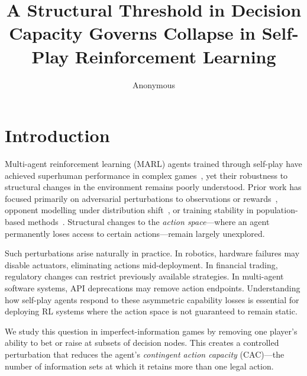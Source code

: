 \documentclass[sigconf,anonymous]{acmart}
\title{A Structural Threshold in Decision Capacity Governs Collapse in Self-Play Reinforcement Learning}
\author{Anonymous}
\affiliation{\institution{Anonymous}}
\begin{document}
\maketitle

\section{Introduction}

Multi-agent reinforcement learning (MARL) agents trained through self-play have achieved superhuman performance in complex games~\cite{silver2018general,brown2019superhuman,vinyals2019grandmaster}, yet their robustness to structural changes in the environment remains poorly understood. Prior work has focused primarily on adversarial perturbations to observations or rewards~\cite{gleave2020adversarial}, opponent modelling under distribution shift~\cite{foerster2018learning}, or training stability in population-based methods~\cite{balduzzi2019open}. Structural changes to the \emph{action space}---where an agent permanently loses access to certain actions---remain largely unexplored.

Such perturbations arise naturally in practice. In robotics, hardware failures may disable actuators, eliminating actions mid-deployment. In financial trading, regulatory changes can restrict previously available strategies. In multi-agent software systems, API deprecations may remove action endpoints. Understanding how self-play agents respond to these asymmetric capability losses is essential for deploying RL systems where the action space is not guaranteed to remain static.

We study this question in imperfect-information games by removing one player's ability to bet or raise at subsets of decision nodes. This creates a controlled perturbation that reduces the agent's \emph{contingent action capacity} (CAC)---the number of information sets at which it retains more than one legal action.
\end{document}
